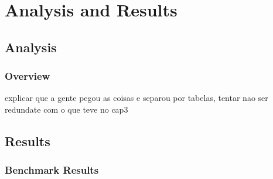 

\chapter{Analysis and Results} \label{chap4:analysis_results}
%

\section{Analysis} \label{sec4:analysis}

\subsection{Overview} \label{sec4:analysis_overview}
    explicar que a gente pegou as coisas e separou por tabelas, tentar nao ser redundate com o que teve no cap3
    
    




\section{Results} \label{sec4:results}
\subsection{Benchmark Results} \label{sec4:benchmark_results}

